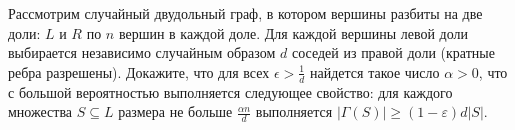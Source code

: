 Рассмотрим случайный двудольный граф, в котором вершины разбиты на две доли: $L$ и $R$ по $n$ вершин в
каждой доле. Для каждой вершины левой доли выбирается независимо случайным образом $d$ соседей из правой
доли (кратные ребра разрешены). Докажите, что для всех $\epsilon > \frac{1}{d}$ найдется такое число
$\alpha > 0$, что с большой вероятностью выполняется следующее свойство: для каждого множества $S
\subseteq L$ размера не больше $\frac{\alpha n}{d}$ выполняется $|\Gamma(S)| \ge (1 - \varepsilon)d |S|$.
